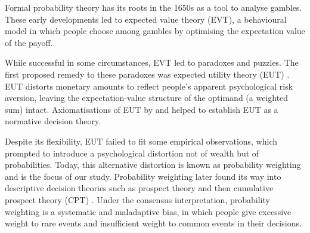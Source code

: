 \documentclass[12pt,letter,timesnewroman]{article}
\newcommand{\ie}{\textit{i.e.}\ }
\begin{document}
Formal probability theory has its roots in the 1650s as a tool to analyse gambles. These early developments led to expected value theory (EVT), a behavioural model in which people choose among gambles by optimising the expectation value of the payoff.


While successful in some circumstances, EVT led to paradoxes and puzzles. The first proposed remedy to these paradoxes was expected utility theory (EUT) \parencite{Bernoulli1738,Laplace1814}.
EUT distorts monetary amounts to reflect people's apparent psychological risk aversion, leaving the expectation-value structure of the optimand (a weighted sum) intact.
Axiomatisations of EUT by \textcite{vonNeumannMorgenstern1944} and \textcite{Savage1954} helped to establish EUT as a normative decision theory.

Despite its flexibility, EUT failed to fit some empirical observations, which prompted \textcite{PrestonBaratta1948} to introduce a psychological distortion not of wealth but of probabilities.
Today, this alternative distortion is known as probability weighting and is the focus of our study.
Probability weighting later found its way into descriptive decision theories such as prospect theory \parencite{KahnemanTversky1979} and then cumulative prospect theory (CPT) \parencite{TverskyKahneman1992}.
Under the consensus interpretation, probability weighting is a systematic and maladaptive bias, in which people give excessive weight to rare events and insufficient weight to common events in their decisions.
\end{document}
